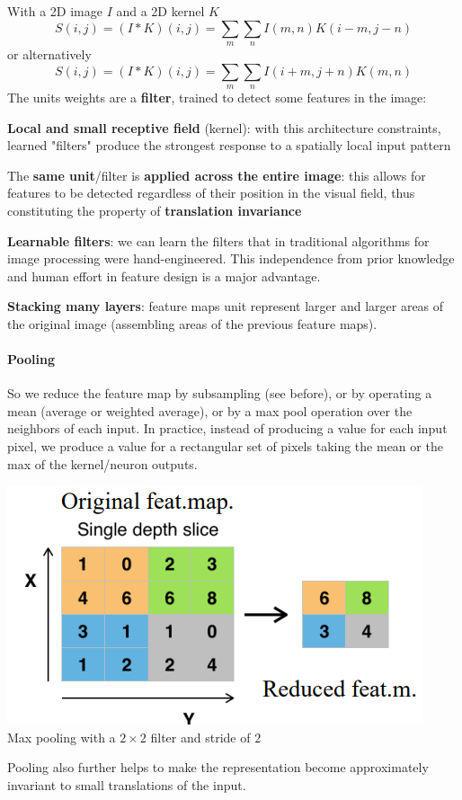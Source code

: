 \documentclass[10pt]{report}
\begin{document}
With a 2D image $I$ and a 2D kernel $K$ $$S(i,j) = (I*K)(i,j)=\sum_m\sum_n I(m,n)K(i-m,j-n)$$ or alternatively $$S(i,j) = (I*K)(i,j)=\sum_m\sum_n I(i+m,j+n)K(m,n)$$
The units weights are a \textbf{filter}, trained to detect some features in the image:
\begin{list}{}{}
	\item \textbf{Local and small receptive field} (kernel): with this architecture constraints, learned "filters" produce the strongest response to a spatially local input pattern
	\item The \textbf{same unit}/filter is \textbf{applied across the entire image}: this allows for features to be detected regardless of their position in the visual field, thus constituting the property of \textbf{translation invariance}
	\item \textbf{Learnable filters}: we can learn the filters that in traditional algorithms for image processing were hand-engineered. This independence from prior knowledge and human effort in feature design is a major advantage.
	\item \textbf{Stacking many layers}: feature maps unit represent larger and larger areas of the original image (assembling areas of the previous feature maps).
\end{list}
\paragraph{Pooling} So we reduce the feature map by subsampling (see before), or by operating a mean (average or weighted average), or by a max pool operation over the neighbors of each input. In practice, instead of producing a value for each input pixel, we produce a value for a rectangular set of pixels taking the mean or the max of the kernel/neuron outputs.
\begin{center}
	\includegraphics[scale=0.5]{29.png}\\
	Max pooling with a $2\times2$ filter and stride of $2$
\end{center}
Pooling also further helps to make the representation become approximately invariant to small translations of the input.
\end{document}
